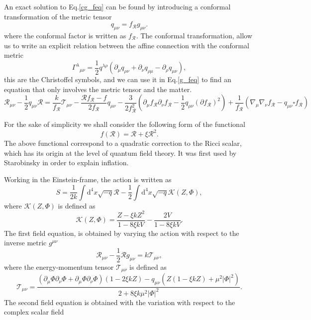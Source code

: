 \documentclass{article}
\begin{document}
An exact solution to Eq.\eqref{cg_feq} can be found by introducing a conformal transformation
of the metric tensor
\begin{equation}
    q_{\mu\nu} = f_{\mathcal{R}}g_{\mu\nu}.
\end{equation}
where the conformal factor is written as $f_{\mathcal{R}}$. The conformal transformation, allow us
to write an explicit relation between the affine connection with the conformal metric
\begin{equation}
    \Gamma^{\lambda}{}_{\mu\nu} = \frac{1}{2}q^{\lambda\rho}\left(\partial_\mu q_{\rho\nu} + 
    \partial_\nu q_{\rho\mu} - \partial_\rho q_{\mu\nu}\right),
\end{equation}
this are the Christoffel symbols, and we can use it in Eq.\eqref{g_feq} to find an equation
that only involves the metric tensor and the matter.
\begin{equation}
    \mathcal{R}_{\mu\nu} - \frac{1}{2}q_{\mu\nu}\mathcal{R} = \frac{k}{f_{\mathcal{R}}}\mathcal{T}_{\mu\nu}
    - \frac{\mathcal{R}f_{\mathcal{R}} - f}{2f_{\mathcal{R}}}q_{\mu\nu} - \frac{3}{2f^2_{\mathcal{R}}}
    \left(\partial_\mu f_{\mathcal{R}} \partial_\nu f_{\mathcal{R}} - \frac{1}{2}q_{\mu\nu}(\partial f_{\mathcal{R}})^2\right)
    + \frac{1}{f_{\mathcal{R}}}\left(\nabla_\mu\nabla_\nu f_{\mathcal{R}} - q_{\mu\nu}\square f_{\mathcal{R}}\right)
\end{equation}

For the sake of simplicity we shall consider the following form of the functional
\begin{equation}
    f(\mathcal{R}) = \mathcal{R} + \xi \mathcal{R}^2.
\end{equation}
The above functional correspond to a quadratic correction to the Ricci scalar, which has
its origin at the level of quantum field theory. It was first used by Starobinsky in order 
to explain inflation.

Working in the Einstein-frame, the action is written as
\begin{equation}
    S = \frac{1}{2k}\int \mathrm{d}^4x \sqrt{-q}\mathcal{R} - \frac{1}{2}\int \mathrm{d}^4x \sqrt{-q}\mathcal{K}(Z,\Phi),
\end{equation}
where $\mathcal{K}(Z,\Phi)$ is defined as
\begin{equation}
    \mathcal{K}(Z,\Phi) = \frac{Z - \xi k Z^2}{1 - 8\xi k V} - \frac{2V}{1 - 8\xi k V}.
\end{equation}
The first field equation, is obtained by varying the action with respect to the
inverse metric $g^{\mu\nu}$
\begin{equation}
    \mathcal{R}_{\mu\nu} - \frac{1}{2}\mathcal{R}g_{\mu\nu} = k\mathcal{T}_{\mu\nu},
    \end{equation} 
where the energy-momentum tensor $\mathcal{T}_{\mu\nu}$ is defined as
\begin{equation}
    \mathcal{T}_{\mu\nu} = \frac{\left(\partial_\mu \Phi \partial_\nu \Phi + \partial_\mu \Phi \partial_\nu \Phi \right)\left(1 - 2\xi k Z\right)
    -q_{\mu\nu}\left( Z\left(1 - \xi k Z\right) +  \mu^2\vert \Phi\vert^2\right)}{2 + 8\xi k \mu^2 \vert \Phi\vert^2}.
\end{equation}
The second field equation is obtained with the variation with respect to the complex
scalar field 
\end{document}
